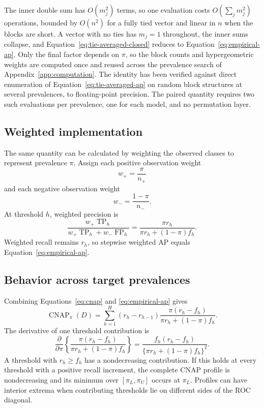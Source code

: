 \documentclass[11pt]{article}
\newcommand{\CNAP}{\operatorname{CNAP}}
\theoremstyle{remark}
\begin{document}
The inner double sum has $O(m_j^2)$ terms, so one evaluation costs $O(\sum_j m_j^2)$ operations, bounded by $O(n^2)$ for a fully tied vector and linear in $n$ when the blocks are short. A vector with no ties has $m_j=1$ throughout, the inner sums collapse, and Equation~\eqref{eq:tie-averaged-closed} reduces to Equation~\eqref{eq:empirical-ap}. Only the final factor depends on $\pi$, so the block counts and hypergeometric weights are computed once and reused across the prevalence search of Appendix~\ref{app:computation}. The identity has been verified against direct enumeration of Equation~\eqref{eq:tie-averaged-ap} on random block structures at several prevalences, to floating-point precision. The paired quantity requires two such evaluations per prevalence, one for each model, and no permutation layer.

\subsection{Weighted implementation}

The same quantity can be calculated by weighting the observed classes to represent prevalence $\pi$. Assign each positive observation weight
\[
w_+=\frac{\pi}{n_+}
\]
and each negative observation weight
\[
w_-=\frac{1-\pi}{n_-}.
\]
At threshold $h$, weighted precision is
\[
\frac{w_+\operatorname{TP}_h}
{w_+\operatorname{TP}_h+w_-\operatorname{FP}_h}
=
\frac{\pi r_h}
{\pi r_h+(1-\pi)f_h}.
\]
Weighted recall remains $r_h$, so stepwise weighted AP equals Equation~\eqref{eq:empirical-ap}.

\subsection{Behavior across target prevalences}

Combining Equations~\eqref{eq:cnap} and \eqref{eq:empirical-ap} gives
\begin{equation}
\CNAP_\pi(D)
=
\sum_{h=1}^{H}
(r_h-r_{h-1})
\frac{\pi(r_h-f_h)}
{\pi r_h+(1-\pi)f_h}.
\label{eq:empirical-cnap-profile}
\end{equation}
The derivative of one threshold contribution is
\begin{equation}
\frac{\partial}{\partial\pi}
\left\{
\frac{\pi(r_h-f_h)}
{\pi r_h+(1-\pi)f_h}
\right\}
=
\frac{f_h(r_h-f_h)}
{\{\pi r_h+(1-\pi)f_h\}^2}.
\label{eq:profile-derivative}
\end{equation}
A threshold with $r_h\geq f_h$ has a nondecreasing contribution. If this holds at every threshold with a positive recall increment, the complete CNAP profile is nondecreasing and its minimum over $[\pi_L,\pi_U]$ occurs at $\pi_L$. Profiles can have interior extrema when contributing thresholds lie on different sides of the ROC diagonal.
\end{document}
